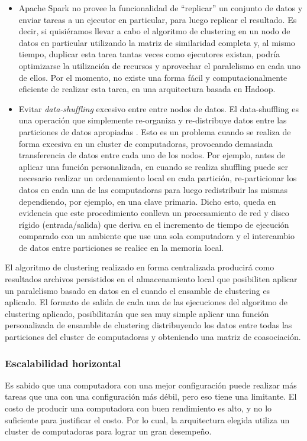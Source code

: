 \begin{itemize}
	\item Apache Spark no provee la funcionalidad de “replicar” un conjunto de datos y enviar tareas a un ejecutor en particular, para luego replicar el resultado. Es decir, si quisiéramos llevar a cabo el algoritmo de clustering en un nodo de datos en particular utilizando la matriz de similaridad completa y, al mismo tiempo, duplicar esta tarea tantas veces como ejecutores existan, podría optimizarse la utilización de recursos y aprovechar el paralelismo en cada uno de ellos. Por el momento, no existe una forma fácil y computacionalmente eficiente de realizar esta tarea, en una arquitectura basada en Hadoop.
	\item Evitar \textit{data-shuffling} excesivo entre entre nodos de datos. El data-shuffling es una operación que simplemente re-organiza y re-distribuye datos entre las particiones de datos apropiadas \citep{zhang2012optimizing}. Esto es un problema cuando se realiza de forma excesiva en un cluster de computadoras, provocando demasiada transferencia de datos entre cada uno de los nodos. Por ejemplo, antes de aplicar una función personalizada, en cuando se realiza shuffling puede ser necesario realizar un ordenamiento local en cada partición, re-particionar los datos en cada una de las computadoras para luego redistribuir las mismas dependiendo, por ejemplo, en una clave primaria. Dicho esto, queda en evidencia que este procedimiento conlleva un procesamiento de red y disco rígido (entrada/salida) que deriva en el incremento de tiempo de ejecución comparado con un ambiente que use una sola computadora y el intercambio de datos entre particiones se realice en la memoria local.
\end{itemize}

El algoritmo de clustering realizado en forma centralizada producirá como resultados archivos persistidos en el almacenamiento local que posibiliten aplicar un paralelismo basado en datos en el cuando el ensamble de clustering es aplicado. El formato de salida de cada una de las ejecuciones del algoritmo de clustering aplicado, posibilitarán que sea muy simple aplicar una función personalizada de ensamble de clustering distribuyendo los datos entre todas las particiones del cluster de computadoras y obteniendo una matriz de coasociación.

\subsubsection{Escalabilidad horizontal}
Es sabido que una computadora con una mejor configuración puede realizar más tareas que una con una configuración más débil, pero eso tiene una limitante. El costo de producir una computadora con buen rendimiento es alto, y no lo suficiente para justificar el costo. Por lo cual, la arquitectura elegida utiliza un cluster de computadoras para lograr un gran desempeño.

